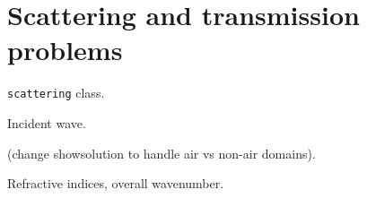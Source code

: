 \section{Scattering and transmission problems}
\label{s:scatt}

{\tt scattering} class.

Incident wave.

(change showsolution to handle air vs non-air domains).

Refractive indices, overall wavenumber.
